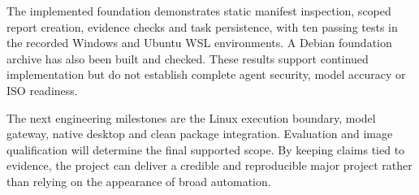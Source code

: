 The implemented foundation demonstrates static manifest inspection, scoped report creation, evidence checks and task persistence, with ten passing tests in the recorded Windows and Ubuntu WSL environments. A Debian foundation archive has also been built and checked. These results support continued implementation but do not establish complete agent security, model accuracy or ISO readiness.

The next engineering milestones are the Linux execution boundary, model gateway, native desktop and clean package integration. Evaluation and image qualification will determine the final supported scope. By keeping claims tied to evidence, the project can deliver a credible and reproducible major project rather than relying on the appearance of broad automation.
